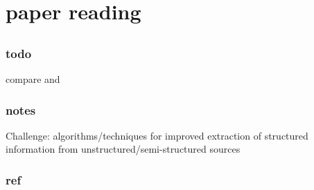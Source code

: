 \documentclass[•]{article}
\begin{document}
\section{paper reading}

\subsection{\cite{Melnik2010}}
\subsubsection{todo}
compare \cite{Melnik2010} and \cite{Armbrust2010}

\subsubsection{notes}
Challenge: algorithms/techniques for improved extraction of structured information from unstructured/semi-structured sources \cite{Dean}

\subsubsection{ref}
\cite{Armbrust2010}


\subsection{\cite{Armbrust2010}}



\end{document}
